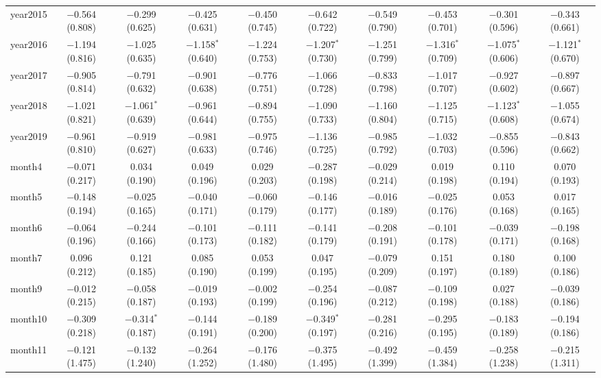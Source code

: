 \begin{table}[!htbp]
\begin{tabular}{@{\extracolsep{1pt}}lccccccccc}
  year2015 & $-$0.564 (0.808) & $-$0.299 (0.625) & $-$0.425 (0.631) & $-$0.450 (0.745) & $-$0.642 (0.722) & $-$0.549 (0.790) & $-$0.453 (0.701) & $-$0.301 (0.596) & $-$0.343 (0.661) \\ 
  year2016 & $-$1.194 (0.816) & $-$1.025 (0.635) & $-$1.158$^{*}$ (0.640) & $-$1.224 (0.753) & $-$1.207$^{*}$ (0.730) & $-$1.251 (0.799) & $-$1.316$^{*}$ (0.709) & $-$1.075$^{*}$ (0.606) & $-$1.121$^{*}$ (0.670) \\ 
  year2017 & $-$0.905 (0.814) & $-$0.791 (0.632) & $-$0.901 (0.638) & $-$0.776 (0.751) & $-$1.066 (0.728) & $-$0.833 (0.798) & $-$1.017 (0.707) & $-$0.927 (0.602) & $-$0.897 (0.667) \\ 
  year2018 & $-$1.021 (0.821) & $-$1.061$^{*}$ (0.639) & $-$0.961 (0.644) & $-$0.894 (0.755) & $-$1.090 (0.733) & $-$1.160 (0.804) & $-$1.125 (0.715) & $-$1.123$^{*}$ (0.608) & $-$1.055 (0.674) \\ 
  year2019 & $-$0.961 (0.810) & $-$0.919 (0.627) & $-$0.981 (0.633) & $-$0.975 (0.746) & $-$1.136 (0.725) & $-$0.985 (0.792) & $-$1.032 (0.703) & $-$0.855 (0.596) & $-$0.843 (0.662) \\ 
  month4 & $-$0.071 (0.217) & 0.034 (0.190) & 0.049 (0.196) & 0.029 (0.203) & $-$0.287 (0.198) & $-$0.029 (0.214) & 0.019 (0.198) & 0.110 (0.194) & 0.070 (0.193) \\ 
  month5 & $-$0.148 (0.194) & $-$0.025 (0.165) & $-$0.040 (0.171) & $-$0.060 (0.179) & $-$0.146 (0.177) & $-$0.016 (0.189) & $-$0.025 (0.176) & 0.053 (0.168) & 0.017 (0.165) \\ 
  month6 & $-$0.064 (0.196) & $-$0.244 (0.166) & $-$0.101 (0.173) & $-$0.111 (0.182) & $-$0.141 (0.179) & $-$0.208 (0.191) & $-$0.101 (0.178) & $-$0.039 (0.171) & $-$0.198 (0.168) \\ 
  month7 & 0.096 (0.212) & 0.121 (0.185) & 0.085 (0.190) & 0.053 (0.199) & 0.047 (0.195) & $-$0.079 (0.209) & 0.151 (0.197) & 0.180 (0.189) & 0.100 (0.186) \\ 
  month9 & $-$0.012 (0.215) & $-$0.058 (0.187) & $-$0.019 (0.193) & $-$0.002 (0.199) & $-$0.254 (0.196) & $-$0.087 (0.212) & $-$0.109 (0.198) & 0.027 (0.188) & $-$0.039 (0.186) \\ 
  month10 & $-$0.309 (0.218) & $-$0.314$^{*}$ (0.187) & $-$0.144 (0.191) & $-$0.189 (0.200) & $-$0.349$^{*}$ (0.197) & $-$0.281 (0.216) & $-$0.295 (0.195) & $-$0.183 (0.189) & $-$0.194 (0.186) \\ 
  month11 & $-$0.121 (1.475) & $-$0.132 (1.240) & $-$0.264 (1.252) & $-$0.176 (1.480) & $-$0.375 (1.495) & $-$0.492 (1.399) & $-$0.459 (1.384) & $-$0.258 (1.238) & $-$0.215 (1.311) \\ 

\end{tabular}
\end{table}
